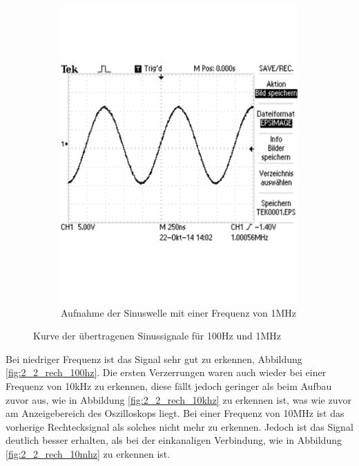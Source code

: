 \documentclass[12pt,a4paper]{article}
\begin{document}
\begin{figure}[H]
\begin{subfigure}[b]{0.48\textwidth}
                \includegraphics[width=\textwidth , scale = 0.4]{2_2_sin_1mhz.pdf}
                \caption[Aufnahme der Sinuswelle mit einer Frequenz von 1MHz]{Aufnahme der Sinuswelle mit einer Frequenz von 1MHz}
  				\label{fig:2_2_sin_1mhz}
        \end{subfigure}
        \caption{Kurve der übertragenen Sinussignale für 100Hz und 1MHz}
        \label{fig:2_2_sin_vergleich}
\end{figure}

Bei niedriger Frequenz ist das Signal sehr gut zu erkennen, Abbildung \ref{fig:2_2_rech_100hz}.
Die ersten Verzerrungen waren auch wieder bei einer Frequenz von 10kHz zu erkennen, diese fällt jedoch geringer als beim Aufbau zuvor aus, wie in Abbildung \ref{fig:2_2_rech_10khz} zu erkennen ist, was wie zuvor am Anzeigebereich des Oszilloskops liegt.
Bei einer Frequenz von 10MHz ist das vorherige Rechtecksignal als solches nicht mehr zu erkennen. Jedoch ist das Signal deutlich besser erhalten, als bei der einkanaligen Verbindung, wie in Abbildung \ref{fig:2_2_rech_10mhz} zu erkennen ist.
\end{document}
